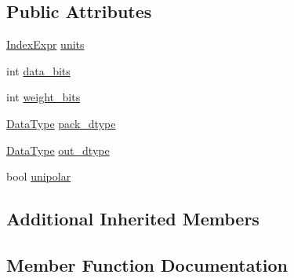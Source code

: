 \subsection*{Public Attributes}
\begin{DoxyCompactItemize}
\item 
\hyperlink{namespacetvm_1_1relay_ae153a27d81399fd266b8d598227764c4}{Index\+Expr} \hyperlink{structtvm_1_1relay_1_1BinaryDenseAttrs_a5373b2f2aac19653ae21aec74c69cdb0}{units}
\item 
int \hyperlink{structtvm_1_1relay_1_1BinaryDenseAttrs_a080c3768bc73266ef675953ea98c8ae8}{data\+\_\+bits}
\item 
int \hyperlink{structtvm_1_1relay_1_1BinaryDenseAttrs_a6647c2d9d1d3108c6f552ff4271f2625}{weight\+\_\+bits}
\item 
\hyperlink{namespacetvm_a41918af1a1dc386388639a9d3ad06c5d}{Data\+Type} \hyperlink{structtvm_1_1relay_1_1BinaryDenseAttrs_a6aac82cbb3d54c5770fa035c0c9f81a2}{pack\+\_\+dtype}
\item 
\hyperlink{namespacetvm_a41918af1a1dc386388639a9d3ad06c5d}{Data\+Type} \hyperlink{structtvm_1_1relay_1_1BinaryDenseAttrs_a8a391a620450d8c0e4449774a60272c6}{out\+\_\+dtype}
\item 
bool \hyperlink{structtvm_1_1relay_1_1BinaryDenseAttrs_af21cdb9dac67ab9ecea5a19642658d8a}{unipolar}
\end{DoxyCompactItemize}
\subsection*{Additional Inherited Members}


\subsection{Member Function Documentation}
